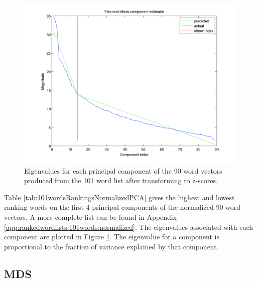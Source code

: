 \documentclass[10pt,letterpaper]{book}
\begin{document}
\begin{figure}[!htbp]
    \includegraphics[width=0.9\linewidth]{100words-adj-800dim-lowercase_wmt_model-zscore_transformed-flex_end_elbow}
    \caption{Eigenvalues for each principal component of the 90 word vectors
    produced from the 101 word list after transforming to z-scores.}
    \label{fig:101wordsnormalizedpcaeigenvalues}
\end{figure}

Table \ref{tab:101wordsRankingsNormalizedPCA} gives the highest and lowest
ranking words on the first 4 principal components of the normalized 90 word 
vectors. A more complete list can be found in Appendix 
\ref{app:rankedwordlists:101words:normalized}. The eigenvalues associated 
with each component are plotted in Figure 
\ref{fig:101wordsnormalizedpcaeigenvalues}. The eigenvalue for a component is
proportional to the fraction of variance explained by that component.


\subsection{MDS}


\end{document}
